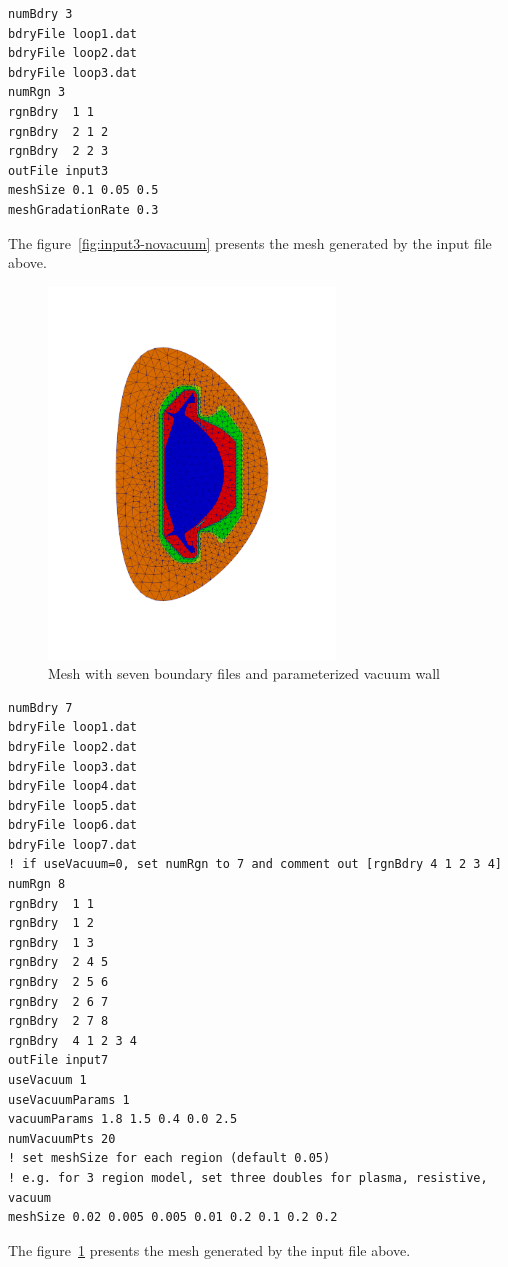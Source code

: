 \begin{verbatim}
numBdry 3
bdryFile loop1.dat
bdryFile loop2.dat
bdryFile loop3.dat
numRgn 3
rgnBdry  1 1
rgnBdry  2 1 2
rgnBdry  2 2 3
outFile input3
meshSize 0.1 0.05 0.5
meshGradationRate 0.3
\end{verbatim}

The figure~\ref{fig:input3-novacuum} presents the mesh generated by the input file above.

\begin{figure}
\centering
\includegraphics[width=3in]{./figures/meshgen-input7.pdf}
\caption[Mesh with seven boundary files and parameterized vacuum wall]
{Mesh with seven boundary files and parameterized vacuum wall}
\label{fig:input7-vacuum}
\end{figure}

\begin{verbatim}
numBdry 7
bdryFile loop1.dat
bdryFile loop2.dat
bdryFile loop3.dat
bdryFile loop4.dat
bdryFile loop5.dat
bdryFile loop6.dat
bdryFile loop7.dat
! if useVacuum=0, set numRgn to 7 and comment out [rgnBdry 4 1 2 3 4]
numRgn 8	
rgnBdry  1 1
rgnBdry  1 2
rgnBdry  1 3
rgnBdry  2 4 5
rgnBdry  2 5 6
rgnBdry  2 6 7
rgnBdry  2 7 8
rgnBdry  4 1 2 3 4
outFile input7
useVacuum 1
useVacuumParams 1
vacuumParams 1.8 1.5 0.4 0.0 2.5
numVacuumPts 20
! set meshSize for each region (default 0.05)
! e.g. for 3 region model, set three doubles for plasma, resistive, vacuum
meshSize 0.02 0.005 0.005 0.01 0.2 0.1 0.2 0.2 
\end{verbatim}

The figure~\ref{fig:input7-vacuum} presents the mesh generated by the input file above.


